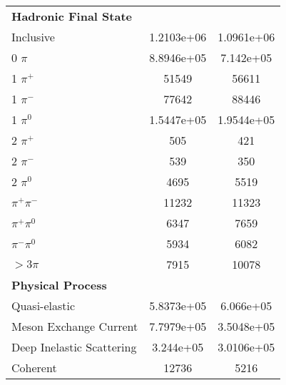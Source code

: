 \begin{longtable}{| l || * {2}{c | } }
 \hline 
 \textbf{Hadronic Final State } &  & 
 \\ 
Inclusive & 1.2103e+06 & 1.0961e+06 \\ 
0 \( \pi \) & 8.8946e+05 & 7.142e+05 \\ 
1 \( \pi^+ \) & 51549 & 56611 \\ 
1 \( \pi^- \) & 77642 & 88446 \\ 
1 \( \pi^0 \) & 1.5447e+05 & 1.9544e+05 \\ 
2 \( \pi^+ \) & 505 & 421 \\ 
2 \( \pi^- \) & 539 & 350 \\ 
2 \( \pi^0 \) & 4695 & 5519 \\ 
\( \pi^+ \pi^- \) & 11232 & 11323 \\ 
\( \pi^+ \pi^0 \) & 6347 & 7659 \\ 
\( \pi^- \pi^0 \) & 5934 & 6082 \\ 
\( > 3 \pi \) & 7915 & 10078 \\ 
 \textbf{Physical Process } &
 & 
 \\ 
Quasi-elastic & 5.8373e+05 & 6.066e+05 \\ 
Meson Exchange Current & 7.7979e+05 & 3.5048e+05 \\ 
Deep Inelastic Scattering & 3.244e+05 & 3.0106e+05 \\ 
Coherent & 12736 & 5216 \\ 
 \hline 
\end{longtable}

